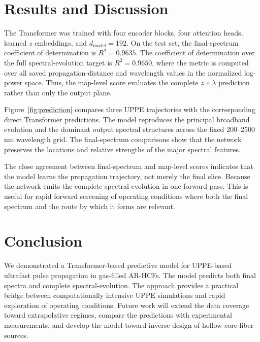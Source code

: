 \documentclass[conference,letterpaper]{IEEEtran}
\begin{document}
\section{Results and Discussion}
The Transformer was trained with four encoder blocks, four attention heads, learned $z$ embeddings, and $d_{\mathrm{model}}=192$. On the test set, the final-spectrum coefficient of determination is $R^2=0.9635$. The coefficient of determination over the full spectral-evolution target is $R^2=0.9650$, where the metric is computed over all saved propagation-distance and wavelength values in the normalized log-power space. Thus, the map-level score evaluates the complete $z\times\lambda$ prediction rather than only the output plane.

Figure~\ref{fig:prediction} compares three UPPE trajectories with the corresponding direct Transformer predictions. The model reproduces the principal broadband evolution and the dominant output spectral structures across the fixed 200--2500 nm wavelength grid. The final-spectrum comparisons show that the network preserves the locations and relative strengths of the major spectral features.

The close agreement between final-spectrum and map-level scores indicates that the model learns the propagation trajectory, not merely the final slice. Because the network emits the complete spectral-evolution in one forward pass. This is useful for rapid forward screening of operating conditions where both the final spectrum and the route by which it forms are relevant.

\section{Conclusion}
We demonstrated a Transformer-based predictive model for UPPE-based ultrafast pulse propagation in gas-filled AR-HCFs. The model predicts both final spectra and complete spectral-evolution. The approach provides a practical bridge between computationally intensive UPPE simulations and rapid exploration of operating conditions. Future work will extend the data coverage toward extrapolative regimes, compare the predictions with experimental measurements, and develop the model toward inverse design of hollow-core-fiber sources.
\end{document}
